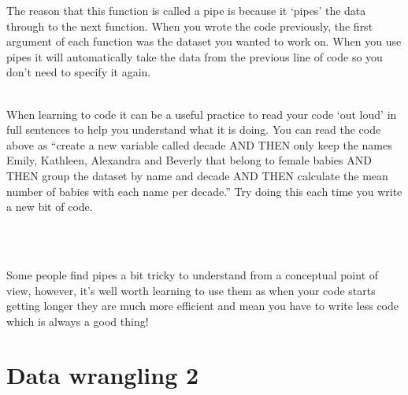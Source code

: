 \documentclass[]{book}
\newenvironment{Shaded}{\begin{snugshade}}{\end{snugshade}}
\newcommand{\DataTypeTok}[1]{\textcolor[rgb]{0.13,0.29,0.53}{#1}}
\newcommand{\DecValTok}[1]{\textcolor[rgb]{0.00,0.00,0.81}{#1}}
\newcommand{\KeywordTok}[1]{\textcolor[rgb]{0.13,0.29,0.53}{\textbf{#1}}}
\newcommand{\NormalTok}[1]{#1}
\newcommand{\OperatorTok}[1]{\textcolor[rgb]{0.81,0.36,0.00}{\textbf{#1}}}
\newcommand{\StringTok}[1]{\textcolor[rgb]{0.31,0.60,0.02}{#1}}
\newenvironment{try}
    {
    \hline\\
    }
    { 
    \\\\\hline
    }
\begin{document}
\begin{Shaded}
\end{Shaded}

The reason that this function is called a pipe is because it `pipes' the data through to the next function. When you wrote the code previously, the first argument of each function was the dataset you wanted to work on. When you use pipes it will automatically take the data from the previous line of code so you don't need to specify it again.

\begin{try}
When learning to code it can be a useful practice to read your code `out
loud' in full sentences to help you understand what it is doing. You can
read the code above as ``create a new variable called decade AND THEN
only keep the names Emily, Kathleen, Alexandra and Beverly that belong
to female babies AND THEN group the dataset by name and decade AND THEN
calculate the mean number of babies with each name per decade.'' Try
doing this each time you write a new bit of code.
\end{try}

Some people find pipes a bit tricky to understand from a conceptual point of view, however, it's well worth learning to use them as when your code starts getting longer they are much more efficient and mean you have to write less code which is always a good thing!

\hypertarget{data-wrangling-2}{%
\chapter{Data wrangling 2}\label{data-wrangling-2}}
\end{document}
